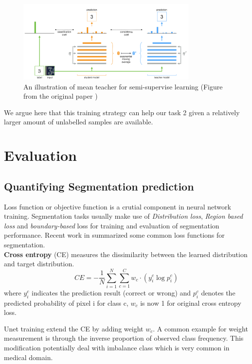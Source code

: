 \begin{figure}
	\centering
	\includegraphics[width=0.8\textwidth]{img/background_img/mean-teacher.png}
	\caption{An illustration of mean teacher for semi-supervise learning (Figure from the original paper \cite{tarvainen_mean_2018})}
	\label{fig:mean-teacher}
\end{figure}

We argue here that this training strategy can help our task 2 given a relatively larger amount of unlabelled samples are available.

\section{Evaluation}
\subsection{Quantifying Segmentation prediction}
Loss function or objective function is a crutial component in neural network training. Segmentation tasks usually make use of \textit{Distribution loss}, \textit{Region based loss} and \textit{boundary-based} loss for training and evaluation of segmentation performance. Recent work in \cite{ma_segmentation_2020} summarized some common loss functions for segmentation. \\

\textbf{Cross entropy} (CE) measures the dissimilarity between the learned distribution and target distribution. 
$$CE = -\frac{1}{N} \sum_{i=1}^{N} \sum_{c=1}^{C} w_{c} \cdot (y_{i}^{c} \log p_{i}^{c})$$ where $y_{i}^{c}$ indicates the prediction result (correct or wrong) and $p_{i}^{c}$ denotes the predicted probability of pixel i for class c, $w_{c}$ is now 1 for original cross entropy loss.

Unet \cite{ronneberger_u-net_2015} training extend the CE by adding weight $w_{c}$. A common example for weight measurement is through the inverse proportion of observed class frequency. This modification potentially deal with imbalance class which is very common in medical domain.\\

